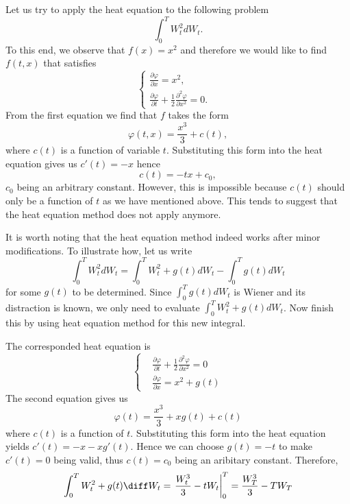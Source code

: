     \problem
    \begin{question}
        Let us try to apply the heat equation to the following problem 
        \[\int_0^T W_t^2dW_t.\]
        To this end, we observe that $f(x)=x^2$ and therefore we would like to find $f(t,x)$ that satisfies
        \begin{equation}
        \left\{
        \begin{array}{ll}
        \frac{\partial \varphi}{\partial x}=x^2,&\\
        \frac{\partial \varphi}{\partial t}+\frac{1}{2}\frac{\partial^2 \varphi}{\partial x^2}=0.&
        \end{array}
        \right.
        \end{equation}
        From the first equation we find that $f$ takes the form
        \[\varphi(t,x)=\frac{x^3}{3}+c(t),\]
        where $c(t)$ is a function of variable $t$.  Substituting this form into the heat equation gives us $c'(t)=-x$ hence
        \[c(t)=-tx+c_0,\]
        $c_0$ being an arbitrary constant.  However, this is impossible because $c(t)$ should only be a function of $t$ as we have mentioned above.  This tends to suggest that the heat equation method does not apply anymore.

        It is worth noting that the heat equation method indeed works after minor modifications.  To illustrate how, let us write
        \[\int_0^T W_t^2dW_t=\int_0^T W_t^2+g(t)dW_t-\int_0^T g(t)dW_t\]
        for some $g(t)$ to be determined.  Since $\int_0^T g(t)dW_t$ is Wiener and its distraction is known, we only need to evaluate $\int_0^T W_t^2+g(t)dW_t$.  Now finish this by using heat equation method for this new integral.
    \end{question}
    The corresponded heat equation is
    \[\left\{\begin{aligned}
        &\frac{\partial\varphi}{\partial t}
        +\frac{1}{2}\frac{\partial^2\varphi}{\partial x^2}=0\\
        &\frac{\partial\varphi}{\partial x}=x^2+g(t)
    \end{aligned}\right.\]
    The second equation gives us
    \[\varphi(t)=\frac{x^3}{3}+xg(t)+c(t)\]
    where $c(t)$ is a function of $t$. Substituting this form into
    the heat equation yields $c'(t)=-x-xg'(t)$. Hence we can choose
    $g(t)=-t$ to make $c'(t)=0$ being valid, thus $c(t)=c_0$ being an aribitary
    constant. Therefore,
    \[\int_0^TW_t^2+g(t)\diff W_t=\left.\frac{W_t^3}{3}-tW_t\right|_0^T
    =\frac{W_T^3}{3}-TW_T\]

